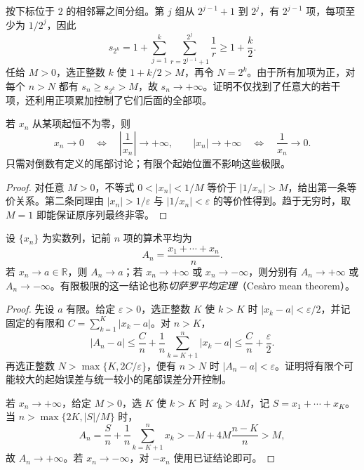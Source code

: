 \begin{solve}
按下标位于 $2$ 的相邻幂之间分组。第 $j$ 组从 $2^{j-1}+1$ 到 $2^j$，有 $2^{j-1}$ 项，每项至少为 $1/2^j$，因此
\[
    s_{2^k}=1+\sum_{j=1}^k\sum_{r=2^{j-1}+1}^{2^j}\frac1r
    \geq1+\frac{k}{2}.
\]
任给 $M>0$，选正整数 $k$ 使 $1+k/2>M$，再令 $N=2^k$。由于所有加项为正，对每个 $n>N$ 都有 $s_n\geq s_{2^k}>M$，故 $s_n\to+\infty$。证明不仅找到了任意大的若干项，还利用正项累加控制了它们后面的全部项。
\end{solve}

\begin{proposition}[无穷小量与倒数的关系]
\label{prop:infinitesimal-sequence-reciprocal}
若 $x_n$ 从某项起恒不为零，则
\begin{equation}
    x_n\to0\quad\Longleftrightarrow\quad
    \left|\frac1{x_n}\right|\to+\infty,
    \qquad
    |x_n|\to+\infty\quad\Longleftrightarrow\quad\frac1{x_n}\to0.
    \label{eq:sequence-infinitesimal-reciprocal}
\end{equation}
只需对倒数有定义的尾部讨论；有限个起始位置不影响这些极限。
\end{proposition}

\begin{proof}
对任意 $M>0$，不等式 $0<|x_n|<1/M$ 等价于 $|1/x_n|>M$，给出第一条等价关系。第二条同理由 $|x_n|>1/\varepsilon$ 与 $|1/x_n|<\varepsilon$ 的等价性得到。趋于无穷时，取 $M=1$ 即能保证原序列最终非零。
\end{proof}

\begin{theorem}[算术平均保持极限]
\label{thm:cesaro-mean-of-convergent-sequence}
设 $\{x_n\}$ 为实数列，记前 $n$ 项的算术平均为
\[
    A_n=\frac{x_1+\cdots+x_n}{n}.
\]
若 $x_n\to a\in\mathbb{R}$，则 $A_n\to a$；若 $x_n\to+\infty$ 或 $x_n\to-\infty$，则分别有 $A_n\to+\infty$ 或 $A_n\to-\infty$。有限极限的这一结论也称\emph{切萨罗平均定理}（Cesàro mean theorem）。
\end{theorem}

\begin{proof}
先设 $a$ 有限。给定 $\varepsilon>0$，选正整数 $K$ 使 $k>K$ 时 $|x_k-a|<\varepsilon/2$，并记固定的有限和 $C=\sum_{k=1}^K|x_k-a|$。对 $n>K$，
\[
    |A_n-a|\leq\frac{C}{n}+\frac1n\sum_{k=K+1}^n|x_k-a|
    \leq\frac{C}{n}+\frac{\varepsilon}{2}.
\]
再选正整数 $N>\max\{K,2C/\varepsilon\}$，便有 $n>N$ 时 $|A_n-a|<\varepsilon$。证明将有限个可能较大的起始误差与统一较小的尾部误差分开控制。

若 $x_n\to+\infty$，给定 $M>0$，选 $K$ 使 $k>K$ 时 $x_k>4M$，记 $S=x_1+\cdots+x_K$。当 $n>\max\{2K,|S|/M\}$ 时，
\[
    A_n=\frac{S}{n}+\frac1n\sum_{k=K+1}^n x_k
    >-M+4M\frac{n-K}{n}>M,
\]
故 $A_n\to+\infty$。若 $x_n\to-\infty$，对 $-x_n$ 使用已证结论即可。
\end{proof}


